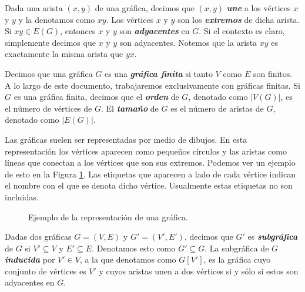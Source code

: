 Dada una arista $(x,y)$ de una gráfica, decimos que $(x,y)$ \textbf{\emph{une}} a los vértices $x$ y $y$ y la denotamos como $xy$. Los vértices $x$ y $y$ son los \textbf{\emph{extremos}} de dicha arista. Si $xy \in E(G)$, entonces $x$ y $y$ son \textbf{\emph{adyacentes}} en $G$. Si el contexto es claro, simplemente decimos que $x$ y $y$ son adyacentes. Notemos que la arista $xy$ es exactamente la misma arista que $yx$.

Decimos que una gráfica $G$ es una \textbf{\textit{gráfica finita}} si tanto $V$ como $E$ son finitos. A lo largo de este documento, trabajaremos exclusivamente con gráficas finitas. Si $G$ es una gráfica finita, decimos que el \textbf{\emph{orden}} de $G$, denotado como $|V(G)|$, es el número de vértices de $G$. El \textbf{\emph{tamaño}} de $G$ es el número de aristas de $G$, denotado como $|E(G)|$.  

Las gráficas suelen ser representadas por medio de dibujos. En esta representación los vértices aparecen como pequeños círculos y las aristas como líneas que conectan a los vértices que son sus extremos. Podemos ver un ejemplo de esto en la Figura \ref{fig_ejemplo_graph}. Las etiquetas que aparecen a lado de cada vértice indican el nombre con el que se denota dicho vértice. Usualmente estas etiquetas no son incluidas. 

\begin{figure}[h]
\begin{center}
\end{center}
\caption{Ejemplo de la representación de una gráfica.}\label{fig_ejemplo_graph}
\end{figure}

Dadas dos gráficas $G=(V,E)$ y $G'=(V',E')$, decimos que $G'$ es \textbf{\emph{subgráfica}} de $G$ si $V' \subseteq V$ y $E' \subseteq E$. Denotamos esto como $G' \subseteq G$. La subgráfica de $G$ \emph{\textbf{inducida}} por $V'\in V$, a la que denotamos como $G[V']$, es la gráfica cuyo conjunto de vértices es $V'$ y cuyos aristas unen a dos vértices si y sólo si estos son adyacentes en $G$. 

